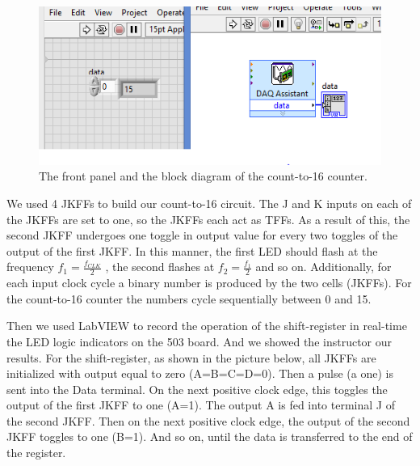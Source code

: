 \documentclass[11pt]{article}
\begin{document}
\begin{figure}[H]
 \begin{center}
  \includegraphics[width=\linewidth/2]{act4_4}
  \caption{The front panel and the block diagram of the count-to-16 counter.}
  \label{fig:act4_4}
 \end{center}
\end{figure}

We used 4 JKFFs to build our count-to-16 circuit. The J and K inputs on each of the JKFFs are set to one, so the JKFFs each act as TFFs. As a result of this, the second JKFF undergoes one toggle in output value for every two toggles of the output of the first JKFF. In this manner, the first LED should flash at the frequency $f_{1} = \frac{f_{CLK}}{2}$ , the second flashes at $f_{2} = \frac{f_{1}}{2}$ and so on. Additionally, for each input clock cycle a binary number is produced by the two cells (JKFFs). For the count-to-16 counter the  numbers  cycle sequentially between 0 and 15.  

\vbox{}

Then we used LabVIEW to record the operation of the shift-register in real-time the LED logic indicators on the 503 board. And we showed the instructor our results. For the shift-register, as shown in the picture below, all JKFFs are initialized with output equal to zero (A=B=C=D=0).  
Then a pulse (a one) is sent into the Data terminal. On the next positive clock edge, this toggles the output of the first JKFF to one (A=1). The output A is fed into terminal J of the second JKFF. Then on the next 
positive clock edge, the output of the second JKFF toggles to one (B=1). And so on, until the data is transferred to the end of the register.
\end{document}
